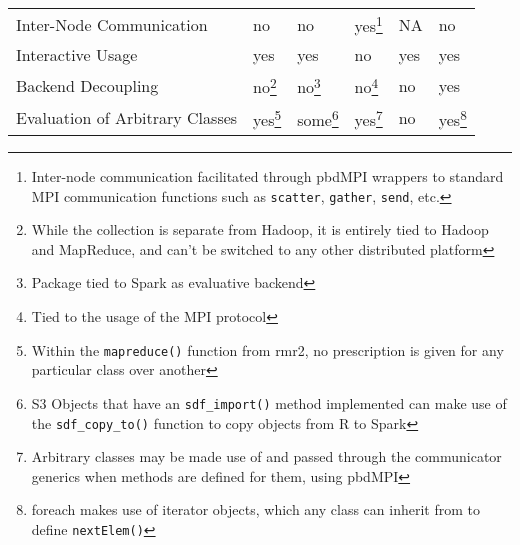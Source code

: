 \begin{table}[htbp]
\begin{tabular}{llllll}
    Inter-Node Communication                                             & no                                                                    & no                                            & yes\footnote{Inter-node
      communication facilitated through pbdMPI wrappers to standard MPI
      communication functions such as \texttt{scatter}, \texttt{gather},
    \texttt{send}, etc.}                                          & NA                                                                    & no                                                                                                                 \\
    Interactive Usage                                                    & yes                                                                   & yes                                           & no                                          & yes        & yes     \\
    Backend Decoupling                                                   & no\footnote{While the collection is separate from
      Hadoop, it is entirely tied to Hadoop and MapReduce, and can't be
    switched to any other distributed platform}                          & no\footnote{Package tied
    to Spark as evaluative backend}                                      & no\footnote{Tied to the usage of the
    MPI protocol}                                                        & no                                                                    & yes                                                                                                                \\
    Evaluation of Arbitrary Classes                                      & yes\footnote{Within the
      \texttt{mapreduce()} function from rmr2, no
    prescription is given for any particular class over another}         &
    some\footnote{S3 Objects that have an
      \texttt{sdf_import()} method implemented can
      make use of the \texttt{sdf_copy_to()}
    function to copy objects from R to Spark}                            & yes\footnote{Arbitrary
      classes may be made use of and passed through the communicator
    generics when methods are defined for them, using pbdMPI}            & no                                                                    &
    yes\footnote{foreach makes use of iterator objects, which any class can
    inherit from to define \texttt{nextElem()}}                                                                                                                                                                                                                \\

\end{tabular}
\end{table}
